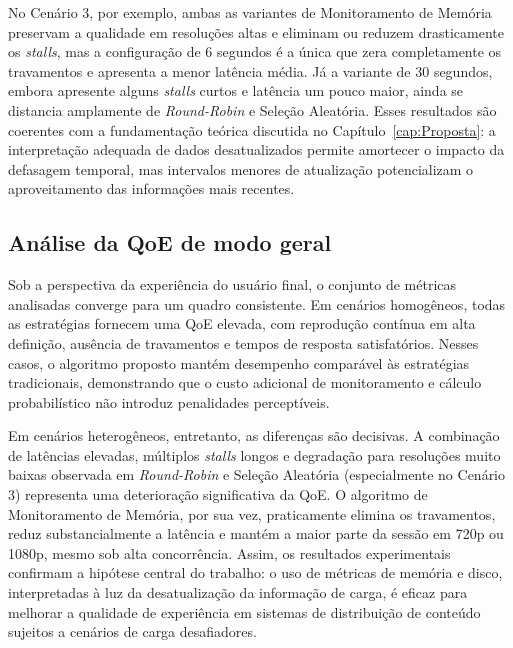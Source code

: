 No Cenário 3, por exemplo, ambas as variantes de Monitoramento de Memória preservam a qualidade em resoluções altas e eliminam ou reduzem drasticamente os \textit{stalls}, mas a configuração de 6 segundos é a única que zera completamente os travamentos e apresenta a menor latência média. Já a variante de 30 segundos, embora apresente alguns \textit{stalls} curtos e latência um pouco maior, ainda se distancia amplamente de \textit{Round-Robin} e Seleção Aleatória. Esses resultados são coerentes com a fundamentação teórica discutida no Capítulo~\ref{cap:Proposta}: a interpretação adequada de dados desatualizados permite amortecer o impacto da defasagem temporal, mas intervalos menores de atualização potencializam o aproveitamento das informações mais recentes.

\subsection{Análise da QoE de modo geral}

Sob a perspectiva da experiência do usuário final, o conjunto de métricas analisadas converge para um quadro consistente. Em cenários homogêneos, todas as estratégias fornecem uma QoE elevada, com reprodução contínua em alta definição, ausência de travamentos e tempos de resposta satisfatórios. Nesses casos, o algoritmo proposto mantém desempenho comparável às estratégias tradicionais, demonstrando que o custo adicional de monitoramento e cálculo probabilístico não introduz penalidades perceptíveis.

Em cenários heterogêneos, entretanto, as diferenças são decisivas. A combinação de latências elevadas, múltiplos \textit{stalls} longos e degradação para resoluções muito baixas observada em \textit{Round-Robin} e Seleção Aleatória (especialmente no Cenário 3) representa uma deterioração significativa da QoE. O algoritmo de Monitoramento de Memória, por sua vez, praticamente elimina os travamentos, reduz substancialmente a latência e mantém a maior parte da sessão em 720p ou 1080p, mesmo sob alta concorrência. Assim, os resultados experimentais confirmam a hipótese central do trabalho: o uso de métricas de memória e disco, interpretadas à luz da desatualização da informação de carga, é eficaz para melhorar a qualidade de experiência em sistemas de distribuição de conteúdo sujeitos a cenários de carga desafiadores.

